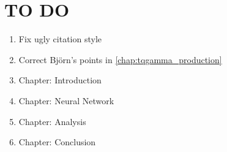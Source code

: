 \chapter{TO DO}
\begin{enumerate}
    \item Fix ugly citation style
    \item Correct Björn's points in \ref{chap:tqgamma_production}
    \item Chapter: Introduction
    \item Chapter: Neural Network 
    \item Chapter: Analysis
    \item Chapter: Conclusion
\end{enumerate}